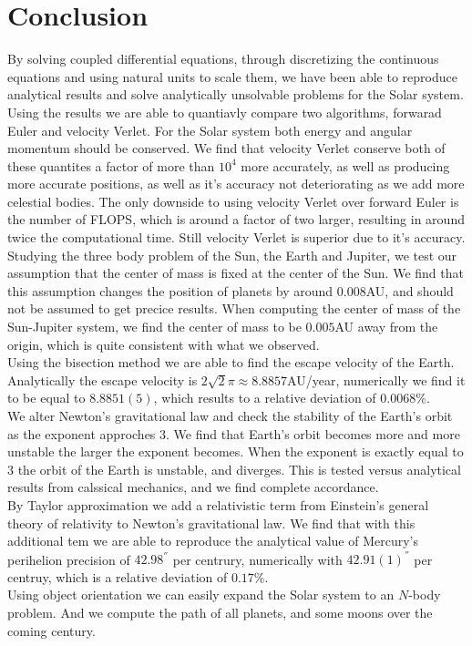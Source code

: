 \documentclass[%
 reprint,
nofootinbib,
aps,
]{revtex4-1}
\begin{document}
\section{Conclusion}
By solving coupled differential equations, through discretizing the continuous equations and using natural units to scale them, we have been able to reproduce analytical results and solve analytically unsolvable problems for the Solar system. Using the results we are able to quantiavly compare two algorithms, forwarad Euler and velocity Verlet. For the Solar system both energy and angular momentum should be conserved. We find that velocity Verlet conserve both of these quantites a factor of more than $10^{4}$ more accurately, as well as producing more accurate positions, as well as it's accuracy not deteriorating as we add more celestial bodies. The only downside to using velocity Verlet over forward Euler is the number of FLOPS, which is around a factor of two larger, resulting in around twice the computational time. Still velocity Verlet is superior due to it's accuracy.\\
Studying the three body problem of the Sun, the Earth and Jupiter, we test our assumption that the center of mass is fixed at the center of the Sun. We find that this assumption changes the position of planets by around $0.008$AU, and should not be assumed to get precice results. When computing the center of mass of the Sun-Jupiter system, we find the center of mass to be $0.005$AU away from the origin, which is quite consistent with what we observed.\\
Using the bisection method we are able to find the escape velocity of the Earth. Analytically the escape velocity is $2\sqrt{2}\pi\approx 8.8857$AU/year, numerically we find it to be equal to $8.8851(5)$, which results to a relative deviation of $0.0068\%$.\\
We alter Newton's gravitational law and check the stability of the Earth's orbit as the exponent approches $3$. We find that Earth's orbit becomes more and more unstable the larger the exponent becomes. When the exponent is exactly equal to $3$ the orbit of the Earth is unstable, and diverges. This is tested versus analytical results from calssical mechanics, and we find complete accordance.\\
By Taylor approximation we add a relativistic term from Einstein's general theory of relativity to Newton's gravitational law. We find that with this additional tem we are able to reproduce the analytical value of Mercury's perihelion precision of $42.98^{''}$ per centrury, numerically with $42.91(1)^{''}$ per centruy, which is a relative deviation of $0.17\%$.\\
Using object orientation we can easily expand the Solar system to an $N$-body problem. And we compute the path of all planets, and some moons over the coming century.
\end{document}
